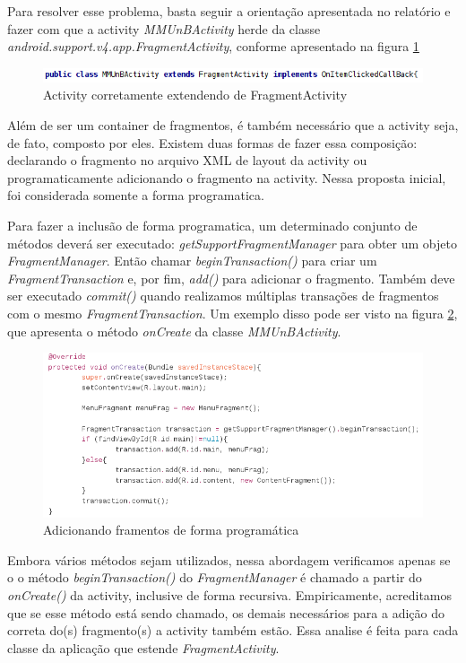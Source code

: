 Para resolver esse problema, basta seguir a orientação apresentada no relatório
e fazer com que a activity {\it MMUnBActivity} herde da classe
{\it android.support.v4.app.FragmentActivity}, conforme apresentado na figura
\ref{herda_FragmentActivity}

\begin{figure}[h]
    \centering
    \includegraphics[width=15cm]{img/heranca_FragmentActivity.png}
    \caption{Activity corretamente extendendo de FragmentActivity}
    \label{herda_FragmentActivity}
\end{figure}

Além de ser um container de fragmentos, é também necessário que a activity seja,
de fato, composto por eles. Existem duas formas de fazer essa composição:
declarando o fragmento no arquivo XML de layout da activity ou programaticamente
adicionando o fragmento na activity. Nessa proposta inicial, foi considerada
somente a forma programatica.

Para fazer a inclusão de forma programatica, um determinado conjunto de métodos
deverá ser executado: {\it getSupportFragmentManager} para obter um objeto {\it
FragmentManager}. Então chamar {\it beginTransaction()} para criar um {\it
FragmentTransaction} e, por fim, {\it add()} para adicionar o fragmento. Também
deve ser executado {\it commit()} quando realizamos múltiplas transações de 
fragmentos com o mesmo {\it FragmentTransaction}. Um exemplo disso pode ser visto
na figura \ref{adicao_fragmento}, que apresenta o método {\it onCreate} da classe
{\it MMUnBActivity}.

\begin{figure}[h]
    \centering
    \includegraphics[width=15cm]{img/add_fragment.png}
    \caption{Adicionando framentos de forma programática}
    \label{adicao_fragmento}
\end{figure}

Embora vários métodos sejam utilizados, nessa abordagem verificamos apenas se o
o método {\it beginTransaction()} do {\it FragmentManager} é chamado a partir do
{\it onCreate()} da activity, inclusive de forma recursiva. Empiricamente,
acreditamos que se esse método está sendo chamado, os demais necessários para a
adição do correta do(s) fragmento(s) a activity também estão. Essa analise é feita
para cada classe da aplicação que estende {\it FragmentActivity}.
